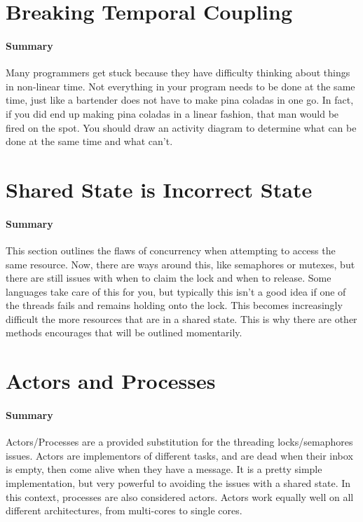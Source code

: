 \documentclass{article}
\begin{document}
\section{Breaking Temporal Coupling}
    \paragraph{Summary} Many programmers get stuck because they have difficulty thinking about things in non-linear time. Not everything in your program needs to be done at the same time, just like a bartender does not have to make pina coladas in one go. In fact, if you did end up making pina coladas in a linear fashion, that man would be fired on the spot. You should draw an activity diagram to determine what can be done at the same time and what can't.

\section{Shared State is Incorrect State}
    \paragraph{Summary} This section outlines the flaws of concurrency when attempting to access the same resource. Now, there are ways around this, like semaphores or mutexes, but there are still issues with when to claim the lock and when to release. Some languages take care of this for you, but typically this isn't a good idea if one of the threads fails and remains holding onto the lock. This becomes increasingly difficult the more resources that are in a shared state. This is why there are other methods encourages that will be outlined momentarily.

\section{Actors and Processes}
    \paragraph{Summary} Actors/Processes are a provided substitution for the threading locks/semaphores issues. Actors are implementors of different tasks, and are dead when their inbox is empty, then come alive when they have a message. It is a pretty simple implementation, but very powerful to avoiding the issues with a shared state. In this context, processes are also considered actors. Actors work equally well on all different architectures, from multi-cores to single cores.
\end{document}

